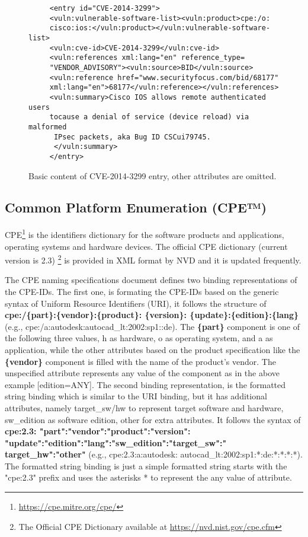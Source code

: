 \documentclass{llncs}
\begin{document}
 \begin{figure}
   
      \lstset{language=XML}
       \begin{lstlisting}
     <entry id="CVE-2014-3299">
     <vuln:vulnerable-software-list><vuln:product>cpe:/o:
     cisco:ios:</vuln:product></vuln:vulnerable-software-list>
     <vuln:cve-id>CVE-2014-3299</vuln:cve-id>
     <vuln:references xml:lang="en" reference_type=
     "VENDOR_ADVISORY"><vuln:source>BID</vuln:source>
     <vuln:reference href="www.securityfocus.com/bid/68177"
     xml:lang="en">68177</vuln:reference></vuln:references>
     <vuln:summary>Cisco IOS allows remote authenticated users 
     tocause a denial of service (device reload) via malformed
      IPsec packets, aka Bug ID CSCui79745.
      </vuln:summary>
     </entry>
       \end{lstlisting}
      \caption{Basic content of CVE-2014-3299 entry, other attributes are omitted.}
       \end{figure}
 
 \subsection{Common Platform Enumeration (CPE™)}
 CPE\footnote{\url{https://cpe.mitre.org/cpe/}} is the identifiers dictionary for the software products and applications, operating systems and hardware devices. The official CPE dictionary (current version is 2.3) \footnote{The Official CPE Dictionary available at \url{https://nvd.nist.gov/cpe.cfm}} is provided in XML format by NVD and it is updated frequently.
 \par The CPE naming specifications document \cite{cpe} defines two binding representations of the CPE-IDs. The first one, is formating the CPE-IDs based on the generic syntax of Uniform Resource Identifiers (URI), it follows the structure of \textbf{cpe:/\{part\}:\{vendor\}:\{product\}:
 \{version\}:
 \{update\}:\{edition\}:\{lang\}} (e.g., cpe:/a:autodesk:autocad\_lt:2002:sp1::de). The \textbf{\{part\}} component is one of the following three values, h as hardware, o as operating system, and a as application, while the other attributes based on the product specification like the \textbf{\{vendor\}} component is filled with the name of the product's vendor. The unspecified attribute represents any value of the component as in the above example [edition=ANY]. 
 The second binding representation, is the  formatted string binding  which is similar to the URI binding, but it has additional attributes, namely target\_sw/hw to represent target software and hardware, sw\_edition as software edition, other for extra attributes. It follows the syntax of  \textbf{cpe:2.3: "part":"vendor":"product":"version":
  "update":"edition":"lang":"sw\newline \_edition":"target\_sw":"
   target\_hw":"other"} (e.g., cpe:2.3:a:autodesk:
   autocad\_lt:2002:sp1:*:de:*:*:*:*). The formatted string binding is just a simple formatted string starts with the  "cpe:2.3" prefix and uses the asterisks * to represent the any value of attribute. 
  
\end{document}
